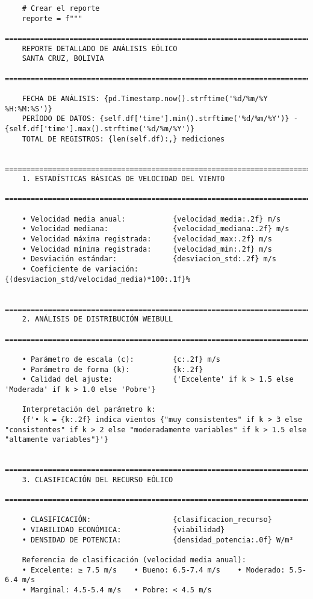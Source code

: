\begin{lstlisting}
	# Crear el reporte
	reporte = f"""
	==================================================================================
	REPORTE DETALLADO DE ANÁLISIS EÓLICO
	SANTA CRUZ, BOLIVIA
	==================================================================================
	
	FECHA DE ANÁLISIS: {pd.Timestamp.now().strftime('%d/%m/%Y %H:%M:%S')}
	PERÍODO DE DATOS: {self.df['time'].min().strftime('%d/%m/%Y')} - {self.df['time'].max().strftime('%d/%m/%Y')}
	TOTAL DE REGISTROS: {len(self.df):,} mediciones
	
	==================================================================================
	1. ESTADÍSTICAS BÁSICAS DE VELOCIDAD DEL VIENTO
	==================================================================================
	
	• Velocidad media anual:           {velocidad_media:.2f} m/s
	• Velocidad mediana:               {velocidad_mediana:.2f} m/s
	• Velocidad máxima registrada:     {velocidad_max:.2f} m/s
	• Velocidad mínima registrada:     {velocidad_min:.2f} m/s
	• Desviación estándar:             {desviacion_std:.2f} m/s
	• Coeficiente de variación:        {(desviacion_std/velocidad_media)*100:.1f}%
	
	==================================================================================
	2. ANÁLISIS DE DISTRIBUCIÓN WEIBULL
	==================================================================================
	
	• Parámetro de escala (c):         {c:.2f} m/s
	• Parámetro de forma (k):          {k:.2f}
	• Calidad del ajuste:              {'Excelente' if k > 1.5 else 'Moderada' if k > 1.0 else 'Pobre'}
	
	Interpretación del parámetro k:
	{f'• k = {k:.2f} indica vientos {"muy consistentes" if k > 3 else "consistentes" if k > 2 else "moderadamente variables" if k > 1.5 else "altamente variables"}'}
	
	==================================================================================
	3. CLASIFICACIÓN DEL RECURSO EÓLICO
	==================================================================================
	
	• CLASIFICACIÓN:                   {clasificacion_recurso}
	• VIABILIDAD ECONÓMICA:            {viabilidad}
	• DENSIDAD DE POTENCIA:            {densidad_potencia:.0f} W/m²
	
	Referencia de clasificación (velocidad media anual):
	• Excelente: ≥ 7.5 m/s    • Bueno: 6.5-7.4 m/s    • Moderado: 5.5-6.4 m/s
	• Marginal: 4.5-5.4 m/s   • Pobre: < 4.5 m/s
	

\end{lstlisting}
